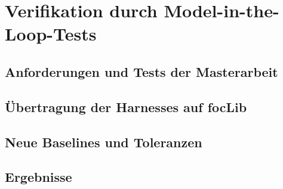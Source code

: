 \chapter{Verifikation durch Model-in-the-Loop-Tests}
\label{ch:verifikation}

\section{Anforderungen und Tests der Masterarbeit}

\section{Übertragung der Harnesses auf focLib}

\section{Neue Baselines und Toleranzen}

\section{Ergebnisse}
